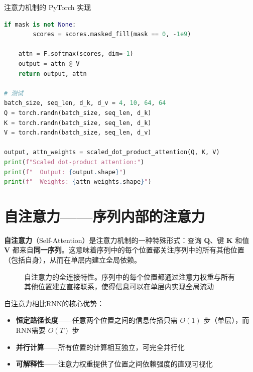 \begin{mycode}{注意力机制的 PyTorch 实现}
\begin{lstlisting}[language=Python]
    if mask is not None:
        scores = scores.masked_fill(mask == 0, -1e9)

    attn = F.softmax(scores, dim=-1)
    output = attn @ V
    return output, attn

# 测试
batch_size, seq_len, d_k, d_v = 4, 10, 64, 64
Q = torch.randn(batch_size, seq_len, d_k)
K = torch.randn(batch_size, seq_len, d_k)
V = torch.randn(batch_size, seq_len, d_v)

output, attn_weights = scaled_dot_product_attention(Q, K, V)
print(f"Scaled dot-product attention:")
print(f"  Output: {output.shape}")
print(f"  Weights: {attn_weights.shape}")
\end{lstlisting}
\end{mycode}

\section{自注意力——序列内部的注意力}

\textbf{自注意力}（Self-Attention）是注意力机制的一种特殊形式：查询 $\mathbf{Q}$、键 $\mathbf{K}$ 和值 $\mathbf{V}$ 都来自\textbf{同一序列}。这意味着序列中的每个位置都关注序列中的所有其他位置（包括自身），从而在单层内建立全局依赖。

\begin{figure}[H]\centering
{}
\caption{自注意力的全连接特性。序列中的每个位置都通过注意力权重与所有其他位置建立直接联系，使得信息可以在单层内实现全局流动}
\label{fig:self-attention}
\end{figure}

自注意力相比RNN的核心优势：
\begin{itemize}
    \item \textbf{恒定路径长度}——任意两个位置之间的信息传播只需 $O(1)$ 步（单层），而RNN需要 $O(T)$ 步
    \item \textbf{并行计算}——所有位置的计算相互独立，可完全并行化
    \item \textbf{可解释性}——注意力权重提供了位置之间依赖强度的直观可视化
\end{itemize}

